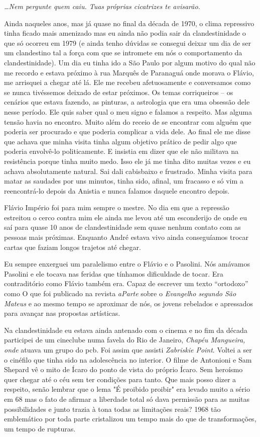 {\it \ldots{}Nem pergunte quem caiu. Tuas próprias cicatrizes te
avisarão.}
\stopblockquote

Ainda naqueles anos, mas já quase no final da década de 1970, o clima
repressivo tinha ficado mais amenizado mas eu ainda não podia sair da
clandestinidade o que só ocorreu em 1979 (e ainda tenho dúvidas se
consegui deixar um dia de ser um clandestino tal a força com que se
intromete em nós o comportamento da clandestinidade). Um dia eu tinha
ido a São Paulo por algum motivo do qual não me recordo e estava próximo
à rua Marquês de Paranaguá onde morava o Flávio, me arrisquei a chegar
até lá. Ele me recebeu afetuosamente e conversamos como se nunca
tivéssemos deixado de estar próximos. Os temas corriqueiros -- os
cenários que estava fazendo, as pinturas, a astrologia que era uma
obsessão dele nesse período. Ele quis saber qual o meu signo e falamos a
respeito. Mas alguma tensão havia no encontro. Muito além do receio de
se encontrar com alguém que poderia ser procurado e que poderia
complicar a vida dele. Ao final ele me disse que achava que minha visita
tinha algum objetivo prático de pedir algo que poderia envolvê-lo
politicamente. E insistia em dizer que ele não militava na resistência
porque tinha muito medo. Isso ele já me tinha dito muitas vezes e eu
achava absolutamente natural. Sai dali cabisbaixo e frustrado. Minha
visita para matar as saudades por uns minutos, tinha sido, afinal, um
fracasso e só vim a reencontrá-lo depois da Anistia e nunca falamos
daquele encontro depois.

Flávio Império foi para mim sempre o mestre. No dia em que a repressão
estreitou o cerco contra mim ele ainda me levou até um esconderijo de
onde eu saí para quase 10 anos de clandestinidade sem quase nenhum
contato com as pessoas mais próximas. Enquanto André estava vivo ainda
conseguíamos trocar cartas que faziam longos trajetos até chegar.

Eu sempre enxerguei um paralelismo entre o Flávio e o Pasolini. Nós
amávamos Pasolini e ele tocava nas feridas que tínhamos dificuldade de
tocar. Era contraditório como Flávio também era. Capaz de escrever um
texto “ortodoxo” como O que foi publicado na revista {\it aParte} sobre
o {\it Evangelho segundo São Mateus} e ao mesmo tempo se aproximar de
nós, os jovens rebelados e apressados para avançar nas propostas
artísticas.

Na clandestinidade eu estava ainda antenado com o cinema e no fim da
década participei de um cineclube numa favela do Rio de Janeiro,
{\it Chapéu Mangueira, onde} atuava um grupo do {\sc pcb}. Foi assim que
assisti {\it Zabriskie Point}. Voltei a ser o cinéfilo que tinha sido na
adolescência no interior. O filme de Antonioni e Sam Shepard vê o mito
de Ícaro do ponto de vista do próprio Ícaro. Sem heroísmo quer chegar
até o céu sem ter condições para tanto. Que mais posso dizer a respeito,
senão lembrar que o lema "É proibido proibir" era levado muito a sério
em 68 mas o fato de afirmar a liberdade total só dava permissão para as
muitas possibilidades e junto trazia à tona todas as limitações reais?
1968 tão emblemático por toda parte cristalizou um tempo mais do que de
transformações, um tempo de rupturas.

